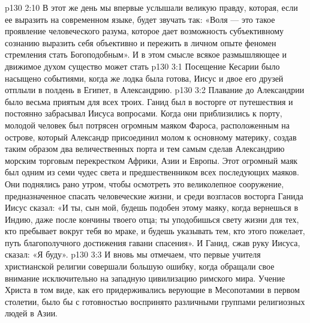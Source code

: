 \vs p130 2:10 \pc В этот же день мы впервые услышали великую правду, которая, если ее выразить на современном языке, будет звучать так: «Воля --- это такое проявление человеческого разума, которое дает возможность субъективному сознанию выразить себя объективно и пережить в личном опыте феномен стремления стать Богоподобным». И в этом смысле всякое размышляющее и движимое духом существо может стать 
\vs p130 3:1 Посещение Кесарии было насыщено событиями, когда же лодка была готова, Иисус и двое его друзей отплыли в полдень в Египет, в Александрию.
\vs p130 3:2 Плавание до Александрии было весьма приятым для всех троих. Ганид был в восторге от путешествия и постоянно забрасывал Иисуса вопросами. Когда они приблизились к порту, молодой человек был потрясен огромным маяком Фароса, расположенным на острове, который Александр присоединил молом к основному материку, создав таким образом два величественных порта и тем самым сделав Александрию морским торговым перекрестком Африки, Азии и Европы. Этот огромный маяк был одним из семи чудес света и предшественником всех последующих маяков. Они поднялись рано утром, чтобы осмотреть это великолепное сооружение, предназначенное спасать человеческие жизни, и среди возгласов восторга Ганида Иисус сказал: «И ты, сын мой, будешь подобен этому маяку, когда вернешься в Индию, даже после кончины твоего отца; ты уподобишься свету жизни для тех, кто пребывает вокруг тебя во мраке, и будешь указывать тем, кто этого пожелает, путь благополучного достижения гавани спасения». И Ганид, сжав руку Иисуса, сказал: «Я буду».
\vs p130 3:3 \pc И вновь мы отмечаем, что первые учителя христианской религии совершали большую ошибку, когда обращали свое внимание исключительно на западную цивилизацию римского мира. Учение Христа в том виде, как его придерживались верующие в Месопотамии в первом столетии, было бы с готовностью воспринято различными группами религиозных людей в Азии.
